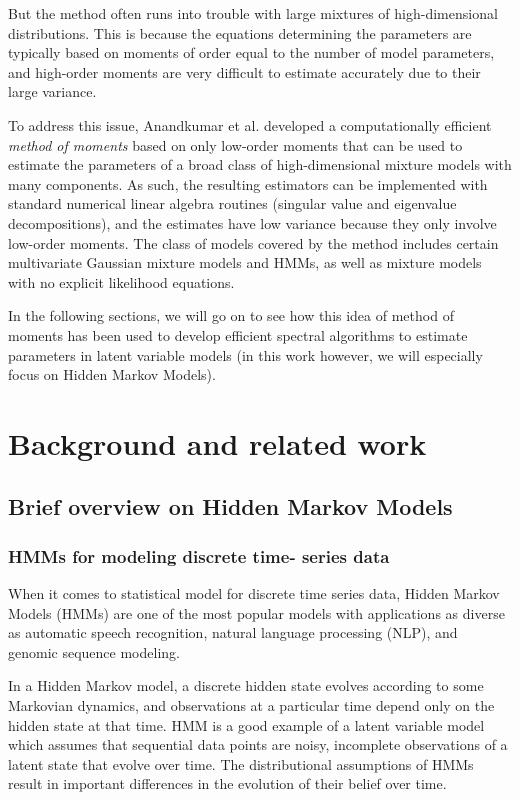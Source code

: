 But the method often runs into trouble with large mixtures of high-dimensional distributions. This is because the equations determining the parameters are typically based on moments of order equal to the number of model parameters, and high-order moments are very difficult to estimate accurately due to their large variance.

To address this issue, Anandkumar et al. \cite{ref6} developed a computationally efficient \textit{method of moments} based on only low-order moments that can be used to estimate the parameters of a broad class of high-dimensional mixture
models with many components. As such, the resulting estimators can be implemented with standard numerical
linear algebra routines (singular value and eigenvalue decompositions), and the estimates have
low variance because they only involve low-order moments.
The class of models covered by the method includes certain multivariate Gaussian mixture models and HMMs, as well as mixture models with no explicit likelihood equations.

In the following sections, we will go on to see how this idea of method of moments has been used to develop efficient spectral algorithms to estimate parameters in latent variable models (in this work however, we will especially focus on Hidden Markov Models).



\section{Background and related work}

\subsection{Brief overview on Hidden Markov Models}

\subsubsection{HMMs for modeling discrete time- series data}

When it comes to statistical model for discrete time series data, Hidden Markov Models (HMMs) \cite{ref1} are one of the most popular models with applications as diverse as automatic speech recognition, natural language processing (NLP), and genomic sequence modeling. 

In a Hidden Markov model, a discrete hidden state evolves according to some Markovian dynamics, and observations at a particular time depend only on the hidden state at that time\cite{ref2}.\newline
HMM is a good example of a latent variable model which assumes
that sequential data points are noisy, incomplete observations
of a latent state that evolve over time.
The distributional assumptions of HMMs result
in important differences in the evolution of their belief
over time.

